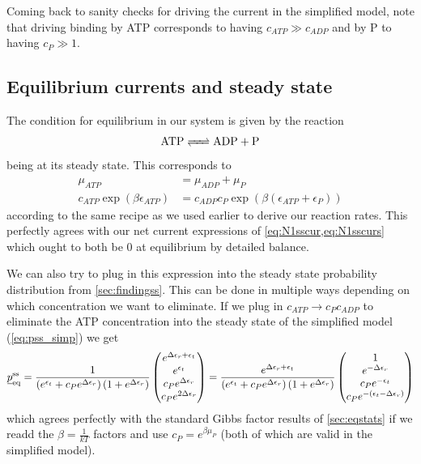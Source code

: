 \documentclass[11pt]{article}
\newcommand{\suf}[2]{\stackunder[0.5pt]{\stackunder[1pt]{\ensuremath{#1}}{\rule{\widthof{\ensuremath{#2}}*\real{0.9}}{.1ex}}}{}}
\newcommand{\su}[1]{\suf{#1}{#1}}
\begin{document}
Coming back to sanity checks for driving the current in the simplified model, note that driving binding by ATP corresponds to having $c_{ATP} \gg c_{ADP}$ and by P to having $c_P \gg 1$.

\subsection{Equilibrium currents and steady state}\label{sec:eqcurss}
The condition for equilibrium in our system is given by the reaction
\begin{equation}
	\ce{ATP <=> ADP + P}
\end{equation}
being at its steady state.
This corresponds to
\begin{align}
	\mu_{ATP}                         & = \mu_{ADP}+\mu_P                                     \\
	c_{ATP}\exp(\beta \epsilon_{ATP}) & = c_{ADP}c_P\exp(\beta (\epsilon_{ATP} + \epsilon_P))
\end{align}
according to the same recipe as we used earlier to derive our reaction rates.
This perfectly agrees with our net current expressions of \cref{eq:N1sscur,eq:N1sscurs} which ought to both be 0 at equilibrium by detailed balance.

We can also try to plug in this expression into the steady state probability distribution from \cref{sec:findingss}.
This can be done in multiple ways depending on which concentration we want to eliminate.
If we plug in $c_{ATP} \rightarrow c_Pc_{ADP}$ to eliminate the ATP concentration into the steady state of the simplified model (\cref{eq:pss_simp}) we get
\begin{equation}
	\su{p}^\text{ss}_\text{eq} = \frac{1}{\left( e^{\epsilon_{t}} + c_P e^{\Delta\epsilon_{r}} \right) \left( 1 + e^{\Delta\epsilon_{r}} \right)}\begin{pmatrix}
		e^{\Delta\epsilon_{r} + \epsilon_{t}} \\
		e^{\epsilon_{t}}                      \\
		c_P e^{\Delta\epsilon_{r}}            \\
		c_P e^{2 \Delta\epsilon_{r}}          \\
	\end{pmatrix} = \frac{e^{\Delta\epsilon_{r} + \epsilon_{t}}}{\left( e^{\epsilon_{t}} + c_P e^{\Delta\epsilon_{r}} \right) \left( 1 + e^{\Delta\epsilon_{r}} \right)}\begin{pmatrix}
		1                                      \\
		e^{-\Delta\epsilon_r}                  \\
		c_P e^{-\epsilon_t}                    \\
		c_P e^{-(\epsilon_t-\Delta\epsilon_r)} \\
	\end{pmatrix}
\end{equation}
which agrees perfectly with the standard Gibbs factor results of \cref{sec:eqstats} if we readd the $\beta=\frac{1}{\si{k}T}$ factors and use $c_P=e^{\beta \mu_P}$ (both of which are valid in the simplified model).
\end{document}
